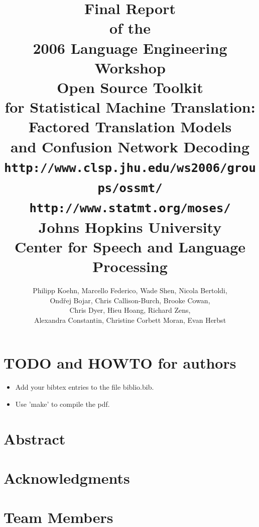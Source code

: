 \documentclass[10pt]{report}
\theoremstyle{plain}
\begin{document}
\title{\vspace{-25mm}\LARGE {\bf Final Report}\\[2mm]
of the\\[2mm]
2006 Language Engineering Workshop\\[15mm]
{\huge \bf Open Source Toolkit\\[2mm]
\bf for Statistical Machine Translation:\\[5mm]
Factored Translation Models\\[2mm]
and Confusion Network Decoding}\\[10mm]
{\tt \Large http://www.clsp.jhu.edu/ws2006/groups/ossmt/}\\[2mm]
{\tt \Large http://www.statmt.org/moses/}\\[15mm]
Johns Hopkins University\\[2mm]
Center for Speech and Language Processing}
\author{\large Philipp Koehn,
Marcello Federico,
Wade Shen,
Nicola Bertoldi,\\
\large Ond\v{r}ej Bojar,
Chris Callison-Burch,
Brooke Cowan,\\
\large Chris Dyer,
Hieu Hoang,
Richard Zens,\\
\large Alexandra Constantin,
Christine Corbett Moran,
Evan Herbst}

\maketitle

\section{TODO and HOWTO for authors}

\begin{itemize}
\item Add your bibtex entries to the file biblio.bib.
\item Use 'make' to compile the pdf.
\end{itemize}

\section*{Abstract}

\newpage
\section*{Acknowledgments}

\newpage
\section*{Team Members}
\end{document}

